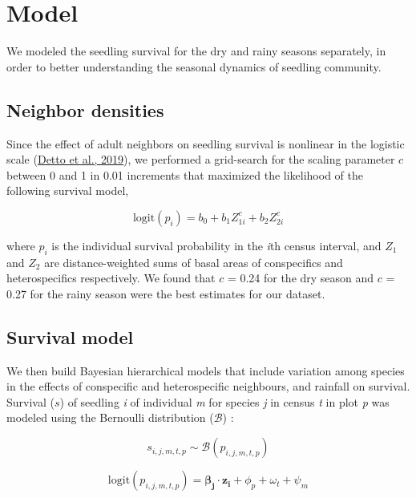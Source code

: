 \documentclass[
  12pt,
  a4paper,
,tablecaptionabove
]{scrartcl}
\date{}
\title{}
\author{}
\begin{document}




\hypertarget{model}{%
\section{Model}\label{model}}

We modeled the seedling survival for the dry and rainy seasons
separately, in order to better understanding the seasonal dynamics of
seedling community.

\hypertarget{neighbor-densities}{%
\subsection{Neighbor densities}\label{neighbor-densities}}

Since the effect of adult neighbors on seedling survival is nonlinear in
the logistic scale (\protect\hyperlink{ref-Detto2019}{Detto et al.,
2019}), we performed a grid-search for the scaling parameter \(c\)
between 0 and 1 in 0.01 increments that maximized the likelihood of the
following survival model,

\[
\mathrm{logit}(p_i) = b_0 + b_1 Z_{1i}^c + b_2 Z_{2i}^c
\]

where \(p_i\) is the individual survival probability in the \emph{i}th
census interval, and \(Z_1\) and \(Z_2\) are distance-weighted sums of
basal areas of conspecifics and heterospecifics respectively. We found
that \(c\) = 0.24 for the dry season and \(c\) = 0.27 for the rainy
season were the best estimates for our dataset.

\hypertarget{survival-model}{%
\subsection{Survival model}\label{survival-model}}

We then build Bayesian hierarchical models that include variation among
species in the effects of conspecific and heterospecific neighbours, and
rainfall on survival. Survival (\(s\)) of seedling \emph{i} of
individual \emph{m} for species \emph{j} in census \emph{t} in plot
\emph{p} was modeled using the Bernoulli distribution (\(\mathcal{B}\))
:

\[
s_{i,j,m,t,p} \sim \mathcal{B}(p_{i, j, m, t, p})
\]

\[
\mathrm{logit}(p_{i,j,m,t,p}) = \boldsymbol{\beta_{j}} \cdot \boldsymbol{z_{i}} + \phi_p + \omega_t + \psi_m
\]
\end{document}
